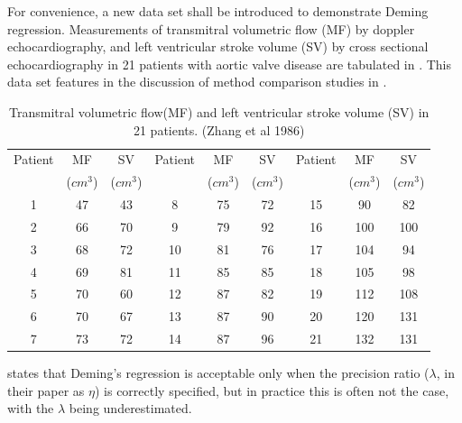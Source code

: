 \documentclass[12pt, a4paper]{report}
\theoremstyle{plain}
\theoremstyle{definition}
\theoremstyle{remark}
\begin{document}
		For convenience, a new data set shall be introduced to demonstrate
		Deming regression. Measurements of transmitral volumetric flow
		(MF) by doppler echocardiography, and left ventricular stroke
		volume (SV) by cross sectional echocardiography in 21 patients
		with aortic valve disease are tabulated in \citet{zhang}. This
		data set features in the discussion of method comparison studies
		in \citet[p.398]{AltmanBook} .
		
		
		\begin{table}[h!]
			\begin{center}
				\begin{tabular}{|c|c|c||c|c|c||c|c|c|}
					\hline
					Patient & MF  & SV  & Patient & MF  & SV  & Patient & MF  & SV \\
					&($cm^{3}$)&  ($cm^{3}$) & &($cm^{3}$)&  ($cm^{3}$) & &($cm^{3}$)&  ($cm^{3}$)
					\\
					\hline
					1 & 47 & 43 &  8 & 75 & 72 &  15 & 90 & 82 \\
					2 & 66 & 70 & 9 & 79 & 92 &  16 & 100 & 100 \\
					3 & 68 & 72 & 10 & 81 & 76 & 17 & 104 & 94 \\
					4 & 69 & 81 & 11 & 85 & 85 &  18 & 105 & 98 \\
					5 & 70 & 60 & 12 & 87 & 82 & 19 & 112 & 108 \\
					6 & 70 & 67 & 13 & 87 & 90 & 20 & 120 & 131 \\
					7 & 73 & 72 & 14 & 87 & 96 &  21 & 132 & 131 \\
					
					\hline
				\end{tabular}
				\caption{Transmitral volumetric flow(MF) and left ventricular
					stroke volume (SV) in 21 patients. (Zhang et al 1986)}
			\end{center}
		\end{table}
		
		
		
		\citet{CarollRupert} states that Deming's
		regression is acceptable only when the precision ratio ($\lambda$,
		in their paper as $\eta$) is correctly specified, but in practice
		this is often not the case, with the $\lambda$ being
		underestimated.
		\newpage
\end{document}
